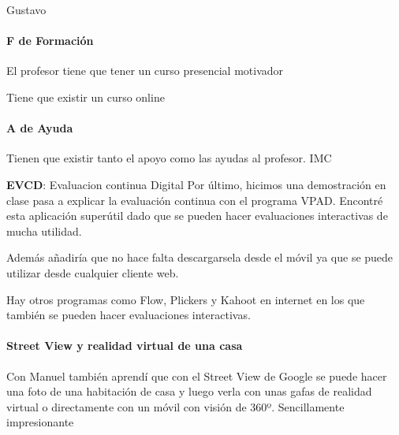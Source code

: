 \begin{opin}{\guscolor}{Gustavo}
\paragraph{F de Formación}
El profesor tiene que tener un curso presencial motivador

Tiene que existir un curso online

\paragraph{A de Ayuda}
Tienen que existir tanto el apoyo como las ayudas al profesor. IMC

\textbf{EVCD}: Evaluacion continua Digital
Por último, hicimos una demostración en clase pasa a explicar la evaluación continua con el programa VPAD. Encontré esta aplicación superútil dado que se pueden hacer evaluaciones interactivas de mucha utilidad.

Además añadiría que no hace falta descargarsela desde el móvil ya que se puede utilizar desde cualquier cliente web.

Hay otros programas como Flow, Plickers y Kahoot en internet en los que también se pueden hacer evaluaciones interactivas.

\paragraph{Street View y realidad virtual de una casa}
Con Manuel también aprendí que con el Street View de Google se puede hacer una foto de una habitación de casa y luego verla con unas gafas de realidad virtual o directamente con un móvil con visión de 360º. Sencillamente impresionante


\end{opin}

